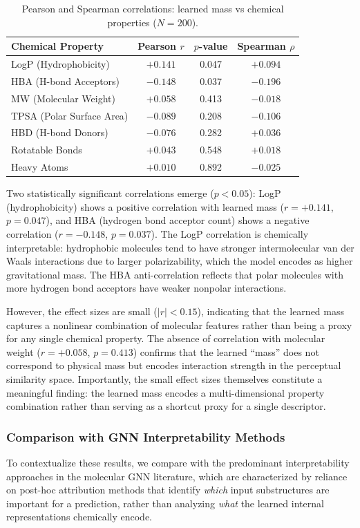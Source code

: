 \documentclass[11pt,a4paper]{article}
\begin{document}
\begin{table}[H]
\centering
\caption{Pearson and Spearman correlations: learned mass vs chemical properties ($N=200$).}
\label{tab:interp}
\begin{tabular}{lccc}
\toprule
Chemical Property & Pearson $r$ & $p$-value & Spearman $\rho$ \\
\midrule
LogP (Hydrophobicity) & $+0.141$ & 0.047 & $+0.094$ \\
HBA (H-bond Acceptors) & $-0.148$ & 0.037 & $-0.196$ \\
MW (Molecular Weight) & $+0.058$ & 0.413 & $-0.018$ \\
TPSA (Polar Surface Area) & $-0.089$ & 0.208 & $-0.106$ \\
HBD (H-bond Donors) & $-0.076$ & 0.282 & $+0.036$ \\
Rotatable Bonds & $+0.043$ & 0.548 & $+0.018$ \\
Heavy Atoms & $+0.010$ & 0.892 & $-0.025$ \\
\bottomrule
\end{tabular}
\end{table}

Two statistically significant correlations emerge ($p < 0.05$): LogP (hydrophobicity) shows a positive correlation with learned mass ($r = +0.141$, $p = 0.047$), and HBA (hydrogen bond acceptor count) shows a negative correlation ($r = -0.148$, $p = 0.037$). The LogP correlation is chemically interpretable: hydrophobic molecules tend to have stronger intermolecular van der Waals interactions due to larger polarizability, which the model encodes as higher gravitational mass. The HBA anti-correlation reflects that polar molecules with more hydrogen bond acceptors have weaker nonpolar interactions.

However, the effect sizes are small ($|r| < 0.15$), indicating that the learned mass captures a nonlinear combination of molecular features rather than being a proxy for any single chemical property. The absence of correlation with molecular weight ($r = +0.058$, $p = 0.413$) confirms that the learned ``mass'' does not correspond to physical mass but encodes interaction strength in the perceptual similarity space. Importantly, the small effect sizes themselves constitute a meaningful finding: the learned mass encodes a multi-dimensional property combination rather than serving as a shortcut proxy for a single descriptor.

\subsubsection{Comparison with GNN Interpretability Methods}
To contextualize these results, we compare with the predominant interpretability approaches in the molecular GNN literature, which are characterized by reliance on post-hoc attribution methods that identify \textit{which} input substructures are important for a prediction, rather than analyzing \textit{what} the learned internal representations chemically encode.
\end{document}
